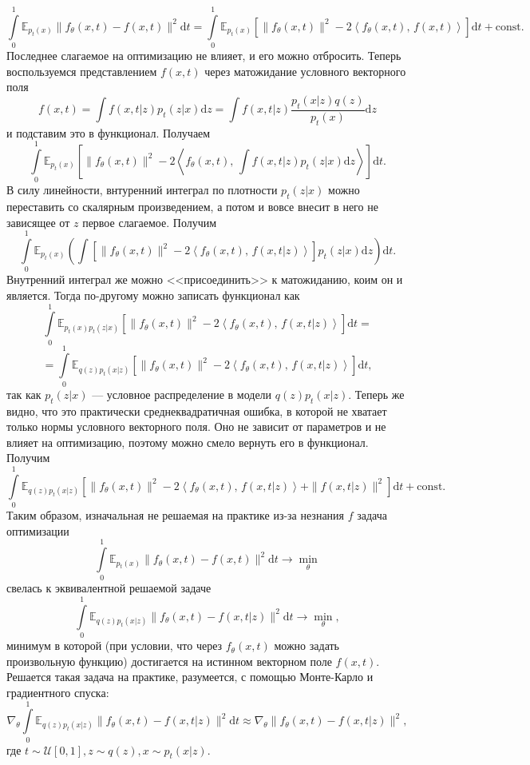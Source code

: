 \documentclass[12pt]{article}
\theoremstyle{definition}
\begin{document}
\[
    \int\limits_{0}^{1}\mathbb{E}_{p_t(x)}\|f_\theta(x, t) - f(x, t) \|^2 \mathrm{d}t = \int\limits_{0}^{1}\mathbb{E}_{p_t(x)} \left[\|f_\theta(x, t)\|^2 - 2 \left\langle f_\theta(x, t),\, f(x, t) \right\rangle\right]\mathrm{d} t + \text{const}.
\]
Последнее слагаемое на оптимизацию не влияет, и его можно отбросить. Теперь воспользуемся представлением $f(x, t)$ через матожидание условного векторного поля
\[
    f(x, t) = \int f(x, t | z) p_t(z | x) \mathrm{d} z = \int f(x, t | z) \frac{p_t(x | z)q(z)}{p_t(x)} \mathrm{d} z
\]
и подставим это в функционал. Получаем
\[
    \int\limits_{0}^{1} \mathbb{E}_{p_t(x)}\left[ \|f_\theta(x, t) \|^2 - 2 \left\langle f_\theta(x, t), \, \int f(x, t | z) p_t(z | x) \mathrm{d} z \right\rangle \right] \mathrm{d} t.
\]
В силу линейности, внтуренний интеграл по плотности $p_t(z | x)$ можно переставить со скалярным произведением, а потом и вовсе внесит в него не зависящее от $z$ первое слагаемое. Получим
\[
    \int\limits_{0}^{1} \mathbb{E}_{p_t(x)}\left(\int \left[\|f_\theta(x, t)\|^2 - 2 \left\langle f_\theta(x, t),\, f(x, t | z) \right\rangle \right] p_t(z |x ) \mathrm{d} z \right)\mathrm{d} t.
\]
Внутренний интеграл же можно <<присоединить>> к матожиданию, коим он и является. Тогда по-другому можно записать функционал как
\[
    \int\limits_{0}^{1} \mathbb{E}_{p_t(x)p_t(z | x)} \left[\|f_\theta(x, t)\|^2 - 2 \left\langle f_\theta(x, t),\, f(x, t | z) \right\rangle \right]\mathrm{d} t =
\]
\[
    = \int\limits_{0}^{1} \mathbb{E}_{q(z)p_t(x | z)} \left[\|f_\theta(x, t)\|^2 - 2 \left\langle f_\theta(x, t),\, f(x, t | z) \right\rangle \right]\mathrm{d} t,
\]
так как $p_t(z | x)$ --- условное распределение в модели $q(z)p_t(x | z)$. Теперь же видно, что это практически среднеквадратичная ошибка, в которой не хватает только нормы условного векторного поля. Оно не зависит от параметров и не влияет на оптимизацию, поэтому можно смело вернуть его в функционал. Получим
\[
    \int\limits_{0}^{1} \mathbb{E}_{q(z)p_t(x | z)} \left[\|f_\theta(x, t)\|^2 - 2 \left\langle f_\theta(x, t),\, f(x, t | z) \right\rangle + \|f(x, t | z)\|^2\right]\mathrm{d} t + \text{const}.
\]
Таким образом, изначальная не решаемая на практике из-за незнания $f$ задача оптимизации  
\[
    \int \limits_{0}^{1} \mathbb{E}_{p_t(x)} \| f_\theta(x, t) - f(x, t) \|^2 \mathrm{d} t \rightarrow \min\limits_{\theta}
\]
свелась к эквивалентной решаемой задаче
\[
    \int\limits_{0}^{1} \mathbb{E}_{q(z)p_t(x|z)} \|f_\theta(x, t) - f(x, t | z) \|^2 \mathrm{d} t \rightarrow \min\limits_{\theta},
\]
минимум в которой (при условии, что через $f_\theta(x, t)$ можно задать произвольную функцию) достигается на истинном векторном поле $f(x, t)$. Решается такая задача на практике, разумеется, с помощью Монте-Карло и градиентного спуска:
\[
    \nabla_\theta \int\limits_{0}^{1} \mathbb{E}_{q(z)p_t(x|z)} \|f_\theta(x, t) - f(x, t | z) \|^2 \mathrm{d} t  \approx \nabla_\theta \|f_\theta(x, t) - f(x, t | z) \|^2, 
\]
где $t \sim \mathcal{U}[0, 1], z \sim q(z), x \sim p_t(x | z)$.
\end{document}
